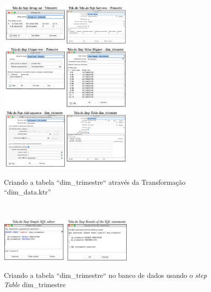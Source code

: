 \begin{figure}[H]
	\vspace*{0,2cm}
    \centering
    \caption{Criando a tabela ``dim\_trimestre`` atrav\'{e}s da Transforma\c{c}\~{a}o ``dim\_data.ktr''}
    \includegraphics[width=0.6\textwidth]{./04-figuras/figura-dim-trimestre}
    \label{fig:ilustfigdimtrimestre}
\end{figure}
\vspace*{-0,9cm}
{\raggedright {}} \\

\begin{figure}[H]
	\vspace*{0,2cm}
    \centering
    \caption{Criando a tabela ``dim\_trimestre`` no banco de dados usando o \textit{step Table} dim\_trimestre}
    \includegraphics[width=0.6\textwidth]{./04-figuras/figura-tb-dim-trimestre}
    \label{fig:ilustfigtbdimtrimestre}
\end{figure}
\vspace*{-0,9cm}
{\raggedright {}} \\

